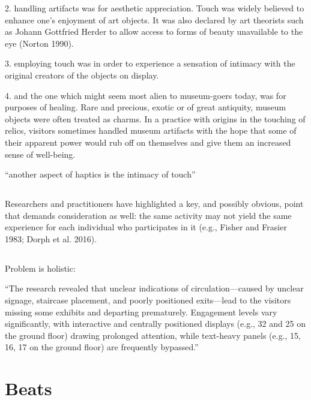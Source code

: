 2. handling artifacts was for aesthetic appreciation. Touch was widely believed to enhance one’s enjoyment of art objects. It was also declared by art theorists such as Johann Gottfried Herder to allow access to forms of beauty unavailable to the eye (Norton 1990). 

3. employing touch was in order to experience a sensation of intimacy with the original creators of the objects on display. 

4. and the one which might seem most alien to museum-goers today, was for purposes of healing. Rare and precious, exotic or of great antiquity, museum objects were often treated as charms. In a practice with origins in the touching of relics, visitors sometimes handled museum artifacts with the hope that some of their apparent power would rub off on themselves and give them an increased sense of well-being.


\cite{classen_touch_2005}
``another aspect of haptics is the intimacy of touch''

\cite{shillito_tacitus_2001}


\subsection{\cite{dorph_visitor_2019}}

Researchers and practitioners have highlighted
a key, and possibly obvious, point that demands
consideration as well: the same activity may not
yield the same experience for each individual
who participates in it (e.g., Fisher and Frasier
1983; Dorph et al. 2016). 



\subsection{\cite{khalifa_visitors_2025}}


Problem is holistic:

``The research revealed that unclear indications of circulation—caused by unclear signage, staircase placement, and poorly positioned exits—lead to the visitors missing some exhibits and departing prematurely. Engagement levels vary significantly, with interactive and centrally positioned displays (e.g., 32 and 25 on the ground floor) drawing prolonged attention, while text-heavy panels (e.g., 15, 16, 17 on the ground floor) are frequently bypassed.''

\section{Beats}

